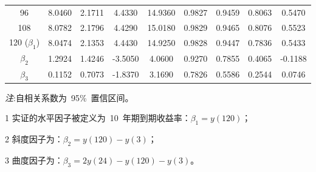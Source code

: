 \begin{center}
\begin{threeparttable}
\begin{tabular}{c c c c c c c c c}
   96 &  8.0460 &  2.1711  & 4.4330 & 14.9360 &  0.9827  & 0.9459  & 0.8063  & 0.5470\\
  108 &  8.0782 &  2.1796  & 4.4290 & 15.0180 &  0.9829  & 0.9465  & 0.8076  & 0.5523\\
  \midrule
120 ($\beta_1$)\tnote{1}
      &8.0474& 2.1353  & 4.4430 & 14.9250 &  0.9828  & 0.9447  & 0.7836  & 0.5433\\
$\beta_2$\tnote{2}
      &  1.2924 &  1.4246  &\hspace{-0.5ex}-3.5050 &  4.0600 &  0.9270  & 0.7855  & 0.4065  &\hspace{-0.5ex}-0.1188\\
$\beta_3$\tnote{3}
      &0.1152& 0.7073  &\hspace{-0.5ex}-1.8370 &  3.1690 &  0.7826  & 0.5586  & 0.2544  & 0.0746\\
   \hline \hline
 \end{tabular}
 \small{%
  \emph{注}:自相关系数为~95\%~置信区间。
 \begin{tablenotes}
\item [1] 实证的水平因子被定义为~10~年期到期收益率：$\beta_1=y(120)$；
\item [2] 斜度因子为：$\beta_2=y(120)-y(3)$；
\item [3] 曲度因子为：$\beta_3=2y(24)-y(120)-y(3)$。
\end{tablenotes}
}%
\end{threeparttable}
\end{center}
